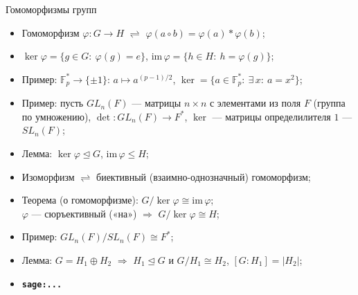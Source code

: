 \documentclass[serif, aspectratio=169]{beamer}
\newcommand{\sagemark}{%
  \textcolor{green!40!black}{\textbf{\texttt{sage:...}}}%
}
\begin{document}
\begin{frame}{Гомоморфизмы групп}
    \begin{itemize}
        \item Гомоморфизм $\varphi:G\to H$ $\rightleftharpoons$ $\varphi(a\circ b)=\varphi(a)*\varphi(b)$;
        \item $\ker\varphi = \{g\in G:\ \varphi(g)=e\}$, $\mathrm{im}\,\varphi = \{h\in H:\ h=\varphi(g)\}$;
        \item Пример: $\mathbb{F}_p^*\to\{\pm1\}:\,a\mapsto a^{(p-1)/2}$, $\ker = \{a\in\mathbb{F}_p^*:\ \exists\, x:\ a=x^2\}$;
        \item Пример: пусть $GL_n(F)$ --- матрицы $n\times n$ с элементами из поля $F$ (группа по умножению), $\det\colon GL_n(F)\to F^*$, $\ker$ --- матрицы определилителя $1$ --- $SL_n(F)$;
        \item Лемма: $\ker\varphi\trianglelefteq G$, $\mathrm{im}\,\varphi\leq H$;
        \item Изоморфизм $\rightleftharpoons$ биективный (взаимно-однозначный) гомоморфизм;
        \item Теорема (о гомоморфизме): $G/\ker\varphi\cong\mathrm{im}\,\varphi$;\\ $\varphi$ --- сюръективный («на») $\Rightarrow$ $G/\ker\varphi\cong H$;
        \item Пример: $GL_n(F)/SL_n(F)\cong F^*$;
        \item Лемма: $G=H_1\oplus H_2$ $\Rightarrow$ $H_1\trianglelefteq G$ и $G/H_1\cong H_2$, $[G:H_1]=|H_2|$;
        \item \sagemark
    \end{itemize}
\end{frame}
\end{document}
